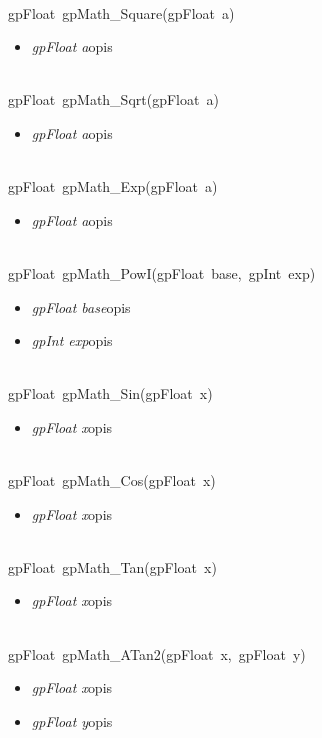  \ \\
\mbox{\textsf{gpFloat gpMath_Square(gpFloat a)}}
	\begin{itemize}
		\item \textit{gpFloat a}\quad opis
	\end{itemize}

 \ \\
\mbox{\textsf{gpFloat gpMath_Sqrt(gpFloat a)}}
	\begin{itemize}
		\item \textit{gpFloat a}\quad opis
	\end{itemize}

 \ \\
\mbox{\textsf{gpFloat gpMath_Exp(gpFloat a)}}
	\begin{itemize}
		\item \textit{gpFloat a}\quad opis
	\end{itemize}

 \ \\
\mbox{\textsf{gpFloat gpMath_PowI(gpFloat base, gpInt exp)}}
	\begin{itemize}
		\item \textit{gpFloat base}\quad opis
		\item \textit{gpInt exp}\quad opis
	\end{itemize}

 \ \\
\mbox{\textsf{gpFloat gpMath_Sin(gpFloat x)}}
	\begin{itemize}
		\item \textit{gpFloat x}\quad opis
	\end{itemize}

 \ \\
\mbox{\textsf{gpFloat gpMath_Cos(gpFloat x)}}
	\begin{itemize}
		\item \textit{gpFloat x}\quad opis
	\end{itemize}

 \ \\
\mbox{\textsf{gpFloat gpMath_Tan(gpFloat x)}}
	\begin{itemize}
		\item \textit{gpFloat x}\quad opis
	\end{itemize}

 \ \\
\mbox{\textsf{gpFloat gpMath_ATan2(gpFloat x, gpFloat y)}}
	\begin{itemize}
		\item \textit{gpFloat x}\quad opis
		\item \textit{gpFloat y}\quad opis
	\end{itemize}

